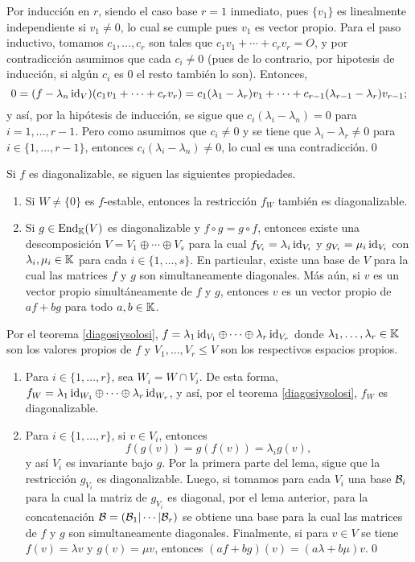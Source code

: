 \dem Por inducci\'on en $r$, siendo el caso base $r=1$ inmediato, pues $\{v_1\}$ es linealmente independiente si $v_1\ne 0$, lo cual se cumple pues $v_1$ es vector propio. Para el paso inductivo, tomamos $c_1,\ldots,c_r$ son tales que $c_1v_1+\cdots+c_rv_r=O$, y por contradicci\'on asumimos que cada $c_i\ne 0$ (pues de lo contrario, por hipotesis de inducci\'on, si alg\'un $c_i$ es $0$ el resto tambi\'en lo son). Entonces,
\[
0=(f-\lambda_n\operatorname{id}_V)(c_1v_1+\cdots+c_rv_r)=c_1(\lambda_1-\lambda_r)v_1+\cdots+c_{r-1}(\lambda_{r-1}-\lambda_r)v_{r-1};
\]
y as\'i, por la hip\'otesis de inducci\'on, se sigue que $c_i(\lambda_i-\lambda_n)=0$ para $i=1,\ldots,r-1$. Pero como asumimos que $c_i\ne 0$ y se tiene que $\lambda_i-\lambda_r\ne 0$ para $i\in\{1,\ldots,r-1\}$, entonces $c_i(\lambda_i-\lambda_n)\ne 0$, lo cual es una contradicci\'on.\qed

\begin{lema}
Si $f$ es diagonalizable, se siguen las siguientes propiedades.
\begin{enumerate}
\item Si $W\ne\{0\}$ es $f$-estable, entonces la restricci\'on $f_{W}$ tambi\'en es diagonalizable. 
\item Si $g\in\operatorname{End}_{\mathbb{K}}(V)$ es diagonalizable y $f\circ g=g\circ f$, entonces existe una descomposición $V=V_1\oplus\cdots\oplus V_s$ para la cual $f_{V_i}=\lambda_i\operatorname{id}_{V_i}$ y $g_{V_i}=\mu_i\operatorname{id}_{V_i}$ con $\lambda_i,\mu_i\in \mathbb{K}$ para cada $i\in\{1,\ldots,s\}$. En particular, existe una base de $V$ para la cual las matrices $f$ y $g$ son simultaneamente diagonales. Más aún, si $v$ es un vector propio simult\'aneamente de $f$ y $g$, entonces $v$ es un vector propio de $af+bg$ para todo $a,b\in \mathbb{K}$.
\end{enumerate}
\end{lema}

\dem Por el teorema \ref{diagosiysolosi}, $f=\lambda_1\operatorname{id}_{V_1}\oplus\cdots\oplus\lambda_r\operatorname{id}_{V_r}$ donde $\lambda_1,\ldots,\lambda_r\in\mathbb{K}$ son los valores propios de $f$ y $V_1,\ldots,V_r\le V$ son los respectivos espacios propios.
  \begin{enumerate} 
    \item Para $i\in\{1,\ldots,r\}$, sea $W_i=W\cap V_i$. De esta forma, $f_W=\lambda_1\operatorname{id}_{W_1}\oplus\cdots\oplus\lambda_r\operatorname{id}_{W_r}$, y así, por el teorema \ref{diagosiysolosi}, $f_W$ es diagonalizable.
    \item Para $i\in\{1,\ldots,r\}$, si $v\in V_i$, entonces
      \[
      f\left(g(v)\right)=g\left(f(v)\right)=\lambda_ig(v),
      \]
      y así $V_i$ es invariante bajo $g$. Por la primera parte del lema, sigue que la restricci\'on $g_{V_i}$ es diagonalizable. Luego, si tomamos para cada $V_i$ una base $\mathcal{B}_i$ para la cual la matriz de $g_{V_i}$ es diagonal, por el lema anterior, para la concatenación $\mathcal{B}=(\mathcal{B}_1|\cdots|\mathcal{B}_r)$ se obtiene una base para la cual las matrices de $f$ y $g$ son simultaneamente diagonales. Finalmente, si para $v\in V$ se tiene $f(v)=\lambda v$ y $g(v)=\mu v$, entonces $(af+bg)(v)=(a\lambda+b\mu)v$.\qed 
\end{enumerate}

